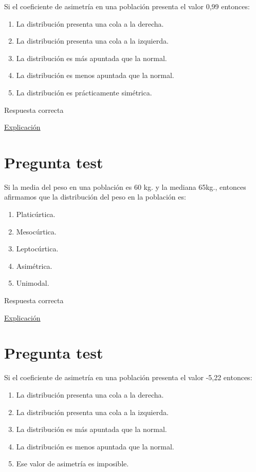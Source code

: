 \documentclass[
]{book}
\providecommand{\tightlist}{%
  \setlength{\itemsep}{0pt}\setlength{\parskip}{0pt}}
\begin{document}
Si el coeficiente de asimetría en una población presenta el valor 0,99 entonces:

\begin{enumerate}
\def\labelenumi{\alph{enumi})}
\tightlist
\item
  La distribución presenta una cola a la derecha.
\item
  La distribución presenta una cola a la izquierda.
\item
  La distribución es más apuntada que la normal.
\item
  La distribución es menos apuntada que la normal.
\item
  La distribución es prácticamente simétrica.
\end{enumerate}

Respuesta correcta

\href{https://1fjmanzano.github.io/bioestadistica/medidas-de-forma.html}{Explicación}

\hypertarget{pregunta-test-79}{%
\section{Pregunta test}\label{pregunta-test-79}}

Si la media del peso en una población es 60 kg. y la mediana 65kg., entonces afirmamos que la distribución del peso en la población es:

\begin{enumerate}
\def\labelenumi{\alph{enumi})}
\tightlist
\item
  Platicúrtica.
\item
  Mesocúrtica.
\item
  Leptocúrtica.
\item
  Asimétrica.
\item
  Unimodal.
\end{enumerate}

Respuesta correcta

\href{https://1fjmanzano.github.io/bioestadistica/medidas-de-forma.html}{Explicación}

\hypertarget{pregunta-test-80}{%
\section{Pregunta test}\label{pregunta-test-80}}

Si el coeficiente de asimetría en una población presenta el valor -5,22 entonces:

\begin{enumerate}
\def\labelenumi{\alph{enumi})}
\tightlist
\item
  La distribución presenta una cola a la derecha.
\item
  La distribución presenta una cola a la izquierda.
\item
  La distribución es más apuntada que la normal.
\item
  La distribución es menos apuntada que la normal.
\item
  Ese valor de asimetría es imposible.
\end{enumerate}
\end{document}
